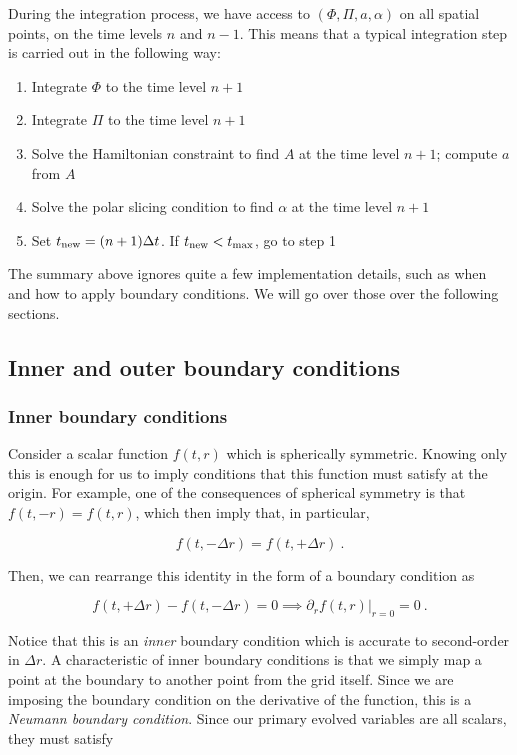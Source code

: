\documentclass[a4paper,11pt]{article}
\renewcommand{\a}{\alpha}
\newcommand{\pd}{\partial}
\newcommand{\dt}{\Delta t}
\newcommand{\dr}{\Delta r}
\newcommand{\lrpar}[1]{\left( #1 \right)}
\newcommand{\n}{\noindent}
\newcommand{\eq}[1]{
  \begin{equation}
    #1
  \end{equation}
}
\begin{document}
During the integration process, we have access to $\lrpar{\Phi,\Pi,a,\a}$ on all spatial points, on the time levels $n$ and $n-1$. This means that a typical integration step is carried out in the following way:

\begin{enumerate}
\item Integrate $\Phi$ to the time level $n+1$
\item Integrate $\Pi$ to the time level $n+1$
\item Solve the Hamiltonian constraint to find $A$ at the time level $n+1$; compute $a$ from $A$
\item Solve the polar slicing condition to find $\a$ at the time level $n+1$
\item Set $t_{\rm new} = (n+1)\dt$. If $t_{\rm new}<t_{\max}$, go to step 1
\end{enumerate}

The summary above ignores quite a few implementation details, such as when and how to apply boundary conditions. We will go over those over the following sections.

\subsection{Inner and outer boundary conditions}

\subsubsection{Inner boundary conditions}

Consider a scalar function $f(t,r)$ which is spherically symmetric. Knowing only this is enough for us to imply conditions that this function must satisfy at the origin. For example, one of the consequences of spherical symmetry is that $f\lrpar{t,-r}=f\lrpar{t,r}$, which then imply that, in particular,

\eq{ f\lrpar{t,-\dr} = f\lrpar{t,+\dr}\ . }

\n Then, we can rearrange this identity in the form of a boundary condition as

\eq{ f\lrpar{t,+\dr} - f\lrpar{t,-\dr} = 0 \implies \left.\pd_{r}f(t,r)\right|_{r=0} = 0\ . }

\n Notice that this is an \emph{inner} boundary condition which is accurate to second-order in $\dr$. A characteristic of inner boundary conditions is that we simply map a point at the boundary to another point from the grid itself. Since we are imposing the boundary condition on the derivative of the function, this is a \emph{Neumann boundary condition}. Since our primary evolved variables are all scalars, they must satisfy
\end{document}
